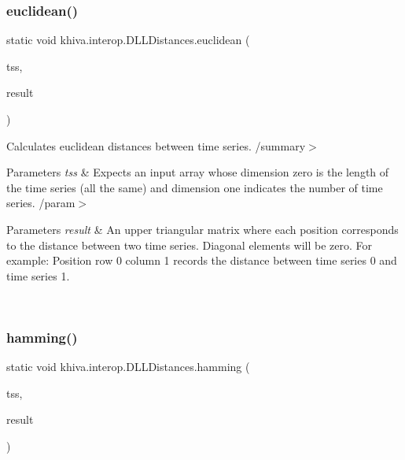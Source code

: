 \subsubsection{\texorpdfstring{euclidean()}{euclidean()}}
{\footnotesize\ttfamily static void khiva.\+interop.\+D\+L\+L\+Distances.\+euclidean (\begin{DoxyParamCaption}\item[{\mbox{[}\+In\mbox{]} ref Int\+Ptr}]{tss,  }\item[{\mbox{[}\+Out\mbox{]} out Int\+Ptr}]{result }\end{DoxyParamCaption})\hspace{0.3cm}{\ttfamily [static]}}



Calculates euclidean distances between time series. /summary$>$ 
\begin{DoxyParams}{Parameters}
{\em tss} & Expects an input array whose dimension zero is the length of the time series (all the same) and dimension one indicates the number of time series. /param$>$ 
\begin{DoxyParams}{Parameters}
{\em result} & An upper triangular matrix where each position corresponds to the distance between two time series. Diagonal elements will be zero. For example\+: Position row 0 column 1 records the distance between time series 0 and time series 1.\\
\hline
\end{DoxyParams}
\\
\hline
\end{DoxyParams}


\mbox{\label{classkhiva_1_1interop_1_1_d_l_l_distances_a684f7b2f7009e190ec568fb71b0a725d}} 
\subsubsection{\texorpdfstring{hamming()}{hamming()}}
{\footnotesize\ttfamily static void khiva.\+interop.\+D\+L\+L\+Distances.\+hamming (\begin{DoxyParamCaption}\item[{\mbox{[}\+In\mbox{]} ref Int\+Ptr}]{tss,  }\item[{\mbox{[}\+Out\mbox{]} out Int\+Ptr}]{result }\end{DoxyParamCaption})\hspace{0.3cm}{\ttfamily [static]}}



